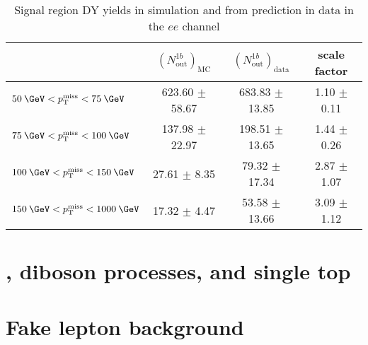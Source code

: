 \begin{table}[!htbp]
  \caption{DY yields and \Rinout values in the $\mu\mu$ channel, for $\geq$1 b-tag selection}
\end{table}


\begin{table}[!htbp]
  \caption{Signal region DY yields in simulation and from \Rinout prediction in data in the $ee$ channel}
  \begin{tabular}{l|c|c|c}
    \hline
                                     & $(N^{1b}_\text{out})_\text{MC}$ & $(N^{1b}_\text{out})_\text{data}$ & scale factor \\ \hline
    $50\:\GeV<\ptmiss<75\:\GeV$      & 623.60 $\pm$  58.67         & 683.83 $\pm$ 13.85         & 1.10 $\pm$ 0.11 \\ 
    $75\:\GeV<\ptmiss<100\:\GeV$     & 137.98 $\pm$  22.97         & 198.51 $\pm$ 13.65           & 1.44 $\pm$ 0.26 \\
    $100\:\GeV<\ptmiss<150\:\GeV$    & 27.61 $\pm$   8.35          & 79.32 $\pm$ 17.34          & 2.87 $\pm$ 1.07 \\
    $150\:\GeV<\ptmiss<1000\:\GeV$   & 17.32 $\pm$   4.47          & 53.58 $\pm$ 13.66         & 3.09 $\pm$ 1.12 \\\hline
  \end{tabular}
\end{table}


\section{\ttV, diboson processes, and single top}

\section{Fake lepton background}
